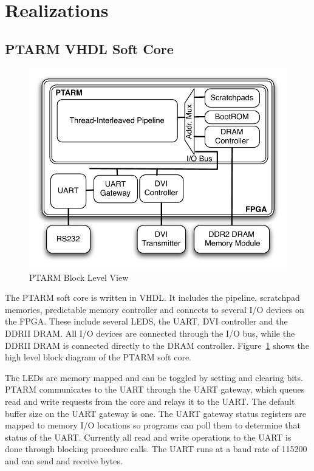 \section{Realizations}
\subsection{PTARM VHDL Soft Core}
\label{sec:ptarm_vhdl_soft_core}
\begin{figure}
  \vspace{-20pt}
  \begin{center}
    \includegraphics[scale=.6]{figs/ptarm_vhdl_high_level}
  \end{center}
  \vspace{-20pt}
  \caption{PTARM Block Level View}
  \label{fig:ptarm_vhdl_high_level}
  \vspace{-10pt}
\end{figure}   
The PTARM soft core is written in VHDL.
It includes the pipeline, scratchpad memories, predictable memory controller and connects to several I/O devices on the FPGA.
These include several LEDS, the UART, DVI controller and the DDRII DRAM.
All I/O devices are connected through the I/O bus, while the DDRII DRAM is connected directly to the DRAM controller.
Figure~\ref{fig:ptarm_vhdl_high_level} shows the high level block diagram of the PTARM soft core.

The LEDs are memory mapped and can be toggled by setting and clearing bits.
PTARM communicates to the UART through the UART gateway, which queues read and write requests from the core and relays it to the UART.
The default buffer size on the UART gateway is one.
The UART gateway status registers are mapped to memory I/O locations so programs can poll them to determine that status of the UART.  
Currently all read and write operations to the UART is done through blocking procedure calls. 
The UART runs at a baud rate of 115200 and can send and receive bytes.

